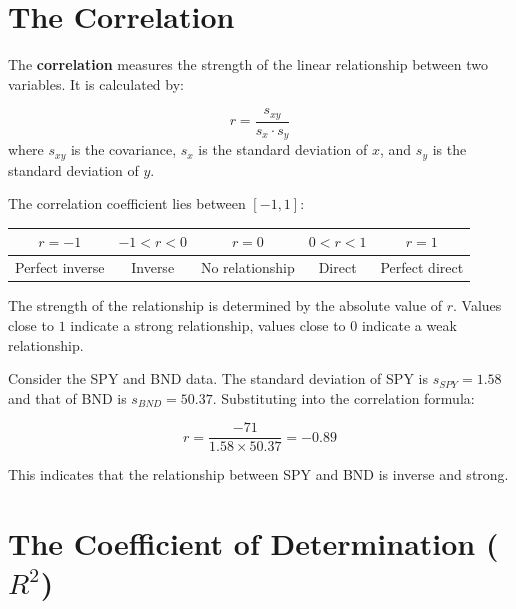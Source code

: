\documentclass[
  11pt,
  letterpaper,
  DIV=11,
  numbers=noendperiod,
  oneside,
  open=any]{scrreprt}
\begin{document}
\section{The Correlation}\label{the-correlation}

The \textbf{correlation} measures the strength of the linear
relationship between two variables. It is calculated by:

\begin{bsformula}

\[r = \frac{s_{xy}}{s_x \cdot s_y}\] where \(s_{xy}\) is the covariance,
\(s_x\) is the standard deviation of \(x\), and \(s_y\) is the standard
deviation of \(y\).

The correlation coefficient lies between \([-1, 1]\):

\begin{center}
\begin{tabular}{ccccc}
\toprule
\(r = -1\) & \(-1 < r < 0\) & \(r = 0\) & \(0 < r < 1\) & \(r = 1\) \\
\midrule
Perfect inverse & Inverse & No relationship & Direct & Perfect direct \\
\bottomrule
\end{tabular}
\end{center}

\end{bsformula}

The strength of the relationship is determined by the absolute value of
\(r\). Values close to \(1\) indicate a strong relationship, values
close to \(0\) indicate a weak relationship.

\begin{bsexample}[Example]

Consider the SPY and BND data. The standard deviation of SPY is
\(s_{SPY} = 1.58\) and that of BND is \(s_{BND} = 50.37\). Substituting
into the correlation formula:

\[r = \frac{-71}{1.58 \times 50.37} = -0.89\]

This indicates that the relationship between SPY and BND is inverse and
strong.

\end{bsexample}

\section{\texorpdfstring{The Coefficient of Determination
(\(R^2\))}{The Coefficient of Determination (R\^{}2)}}\label{the-coefficient-of-determination-r2}
\end{document}
